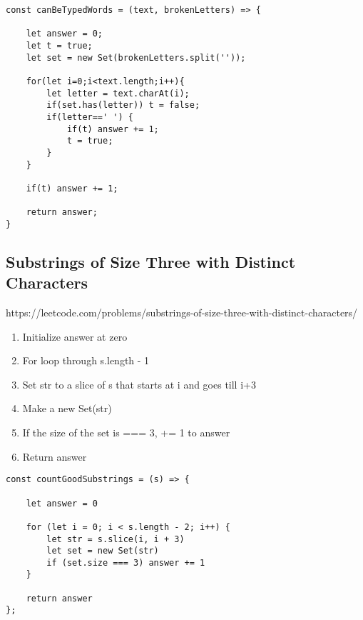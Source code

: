 \documentclass[10pt]{article}
\begin{document}
\begin{lstlisting}[title=Solution canBeTypedWords, captionpos=t]
const canBeTypedWords = (text, brokenLetters) => {

    let answer = 0;
    let t = true;
    let set = new Set(brokenLetters.split(''));
    
    for(let i=0;i<text.length;i++){
        let letter = text.charAt(i);
        if(set.has(letter)) t = false;
        if(letter==' ') {
            if(t) answer += 1;
            t = true;
        }
    }
    
    if(t) answer += 1;
    
    return answer;
}
\end{lstlisting}

\medskip %










\pagebreak %
\medskip   
\subsection{Substrings of Size Three with Distinct Characters}
https://leetcode.com/problems/substrings-of-size-three-with-distinct-characters/

\begin{enumerate}
	\item Initialize answer at zero 
	\item For loop through s.length  - 1
	\item Set str to  a slice of s that starts at i and goes till i+3
	\item Make a new Set(str)
	\item If the size of the set is === 3, += 1 to answer
	\item Return answer
\end{enumerate}

\begin{lstlisting}[title=Solution countGoodSubstrings, captionpos=t]
const countGoodSubstrings = (s) => {

    let answer = 0

    for (let i = 0; i < s.length - 2; i++) {
        let str = s.slice(i, i + 3)
        let set = new Set(str)
        if (set.size === 3) answer += 1
    }

    return answer
};

\end{lstlisting}
\end{document}
